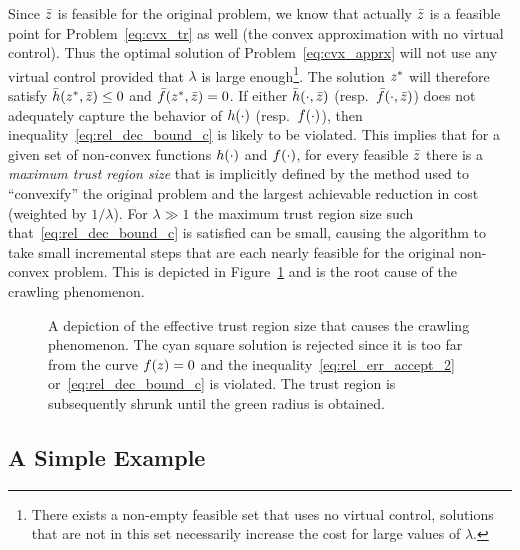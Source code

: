 \documentclass[letterpaper, 10 pt, conference]{ieeeconf}
\begin{document}
Since $\bar{z}$ is feasible for the original problem, we know that actually $\bar{z}$ is a feasible point for Problem~\eqref{eq:cvx_tr} as well (the convex approximation with no virtual control). Thus the optimal solution of Problem~\eqref{eq:cvx_apprx} will not use any virtual control provided that $\lambda$ is large enough\footnote{There exists a non-empty feasible set that uses no virtual control, solutions that are not in this set necessarily increase the cost for large values of $\lambda$.}. The solution $z^*$ will therefore satisfy $\bar{h}(z^*,\bar{z})\leq 0$ and $\bar{f}(z^*,\bar{z})=0$. If either $\bar{h}(\cdot,\bar{z})$ (resp.~$\bar{f}(\cdot,\bar{z})$) does not adequately capture the behavior of $h(\cdot)$ (resp.~$f(\cdot)$), then inequality~\eqref{eq:rel_dec_bound_c} is likely to be violated. This implies that for a given set of non-convex functions $h(\cdot)$ and $f(\cdot)$, for every feasible $\bar{z}$ there is a \textit{maximum trust region size} that is implicitly defined by the method used to ``convexify'' the original problem and the largest achievable reduction in cost (weighted by $1/\lambda$). For $\lambda\gg1$ the maximum trust region size such that~\eqref{eq:rel_dec_bound_c} is satisfied can be small, causing the algorithm to take small incremental steps that are each nearly feasible for the original non-convex problem. This is depicted in Figure~\ref{fig:effective_tr} and is the root cause of the crawling phenomenon.

\begin{figure}
\centering

\caption{A depiction of the effective trust region size that causes the crawling phenomenon. The cyan square solution is rejected since it is too far from the curve $f(z)=0$ and the inequality~\eqref{eq:rel_err_accept_2} or~\eqref{eq:rel_dec_bound_c} is violated. The trust region is subsequently shrunk until the green radius is obtained.}
\label{fig:effective_tr}
\end{figure}

\subsection{A Simple Example}\label{subsec:toy_example}
\end{document}
